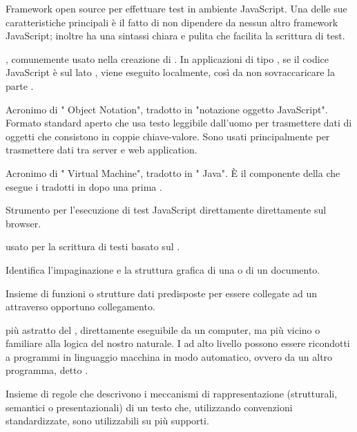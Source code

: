 {Framework open source per effettuare test in ambiente JavaScript. Una delle sue caratteristiche principali è il fatto di non dipendere da nessun altro framework JavaScript; inoltre ha una sintassi chiara e pulita che facilita la scrittura di test.}

{ , comunemente usato nella creazione di . In applicazioni di tipo , se il codice JavaScript è sul lato , viene eseguito localmente, così da non sovraccaricare la parte .}

{Acronimo di " Object Notation", tradotto in "notazione oggetto JavaScript". Formato standard aperto che usa testo leggibile dall'uomo per trasmettere dati di oggetti che consistono in coppie chiave-valore. Sono usati principalmente per trasmettere dati tra server e web application.}

{Acronimo di " Virtual Machine", tradotto in " Java". \`{E} il componente della  che esegue i  tradotti in  dopo una prima .}

{Strumento per l'esecuzione di test JavaScript direttamente direttamente sul browser.}



{ usato per la scrittura di testi basato sul  .}

{Identifica l'impaginazione e la struttura grafica di una  o di un documento.}

{Insieme di funzioni o strutture dati predisposte per essere collegate ad un   attraverso opportuno collegamento.}

{ più astratto del , direttamente eseguibile da un computer, ma più vicino o familiare alla logica del nostro  naturale. I  ad alto livello possono essere ricondotti a programmi in linguaggio macchina in modo automatico, ovvero da un altro programma, detto .}

{Insieme di regole che descrivono i meccanismi di rappresentazione (strutturali, semantici o presentazionali) di un testo che, utilizzando convenzioni standardizzate, sono utilizzabili su più supporti.}

